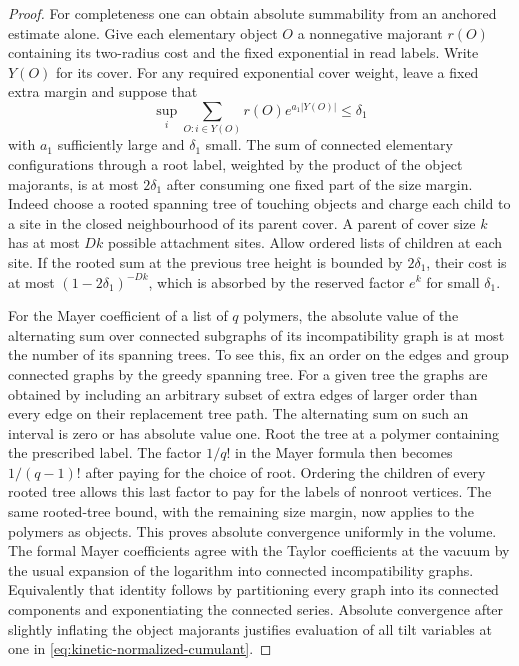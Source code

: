 \documentclass[11pt]{article}
\theoremstyle{definition}
\begin{document}
\begin{proof}
For completeness one can obtain absolute summability from
an anchored estimate alone. Give each elementary object
\(O\) a nonnegative majorant \(r(O)\) containing its
two-radius cost and the fixed exponential in read labels.
Write \(Y(O)\) for its cover. For any required exponential
cover weight, leave a fixed extra margin and suppose that
\begin{equation}
 \sup_i\sum_{O:i\in Y(O)}
      r(O)e^{a_1|Y(O)|}\le\delta_1
\end{equation}
with \(a_1\) sufficiently large and \(\delta_1\) small. The
sum of connected elementary configurations through a root
label, weighted by the product of the object majorants,
is at most \(2\delta_1\) after consuming one fixed part
of the size margin. Indeed choose a rooted spanning tree
of touching objects and charge each child to a site in
the closed neighbourhood of its parent cover. A parent
of cover size \(k\) has at most \(Dk\) possible attachment
sites. Allow ordered lists of children at each site. If
the rooted sum at the previous tree height is bounded by
\(2\delta_1\), their cost is at most
\((1-2\delta_1)^{-Dk}\), which is absorbed by the
reserved factor \(e^k\) for small \(\delta_1\).

For the Mayer coefficient of a list of \(q\) polymers,
the absolute value of the alternating sum over connected
subgraphs of its incompatibility graph is at most the
number of its spanning trees. To see this, fix an order
on the edges and group connected graphs by the greedy
spanning tree. For a given tree the graphs are obtained
by including an arbitrary subset of extra edges of larger
order than every edge on their replacement tree path.
The alternating sum on such an interval is zero or has
absolute value one. Root the tree at a polymer containing
the prescribed label. The factor \(1/q!\) in the Mayer
formula then becomes \(1/(q-1)!\) after paying for the
choice of root. Ordering the children of every rooted
tree allows this last factor to pay for the labels of
nonroot vertices. The same rooted-tree bound, with the
remaining size margin, now applies to the polymers as
objects. This proves absolute convergence uniformly in the
volume. The formal Mayer coefficients agree with the
Taylor coefficients at the vacuum by the usual expansion
of the logarithm into connected incompatibility graphs.
Equivalently that identity follows by partitioning every
graph into its connected components and exponentiating
the connected series. Absolute convergence after
slightly inflating the object majorants justifies
evaluation of all tilt variables at one in
\eqref{eq:kinetic-normalized-cumulant}.


\end{proof}
\end{document}
